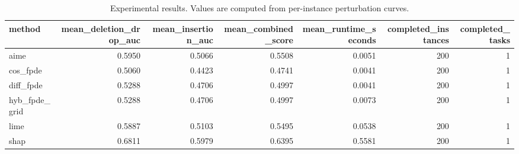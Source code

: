 \begin{table}[t]
\caption{Experimental results. Values are computed from per-instance perturbation curves.}
\label{tab:main_results_computed}
\centering
\begin{tabular}{lrrrrrr}
\toprule
method & mean\_deletion\_drop\_auc & mean\_insertion\_auc & mean\_combined\_score & mean\_runtime\_seconds & completed\_instances & completed\_tasks \\
\midrule
aime & 0.5950 & 0.5066 & 0.5508 & 0.0051 & 200 & 1 \\
cos\_fpde & 0.5060 & 0.4423 & 0.4741 & 0.0041 & 200 & 1 \\
diff\_fpde & 0.5288 & 0.4706 & 0.4997 & 0.0041 & 200 & 1 \\
hyb\_fpde\_grid & 0.5288 & 0.4706 & 0.4997 & 0.0073 & 200 & 1 \\
lime & 0.5887 & 0.5103 & 0.5495 & 0.0538 & 200 & 1 \\
shap & 0.6811 & 0.5979 & 0.6395 & 0.5581 & 200 & 1 \\
\bottomrule
\end{tabular}

\end{table}
